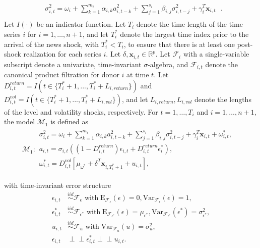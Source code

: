 \documentclass{uiucthesis2021}
\newcommand{\x}{\textbf{x}}
\newcommand{\simiid}{\stackrel{iid}{\sim}} %
\newcommand{\indep}{\perp \!\!\! \perp } %
\def\mrm#1{\mathrm{#1}} %
\def\mc#1{\mathcal{#1}} %
\def\mc#1{\mathcal{#1}}
\theoremstyle{definition}
\begin{document}
\begin{align*}
&\sigma_{i,t}^{2} = \omega_{i} + \sum^{m_{i}}_{k=1}\alpha_{i,k}a^{2}_{i,t-k} + \sum_{j=1}^{s_{i}}\beta_{i,j}\sigma_{i,t-j}^{2} + \gamma_{i}^{T} \x_{i,t} \text{ }. \\
\end{align*}
Let $I(\cdot)$ be an indicator function.  Let $T_i$ denote the time length of the time series $i$ for $i = 1, \ldots, n+1$, and let $T_i^*$ denote the largest time index prior to the arrival of the news shock, with $T_i^* < T_i$, to ensure that there is at least one post-shock realization for each series $i$.  Let $\delta, \x_{i,t} \in \mathbb{R}^{p}$.  Let $\mathcal{F}_{i}$ with a single-variable subscript denote a univariate, time-invariant $\sigma$-algebra, and $\mathcal{F}_{i,t}$ denote the canonical product filtration for donor $i$ at time $t$.  Let $D^{return}_{i,t} = I(t \in \{T_i^* + 1,...,T_i^* + L_{i, return}\})$ and $D^{vol}_{i,t} = I(t \in \{T_i^* + 1,...,T_i^* + L_{i, vol}\})$, and let $L_{i,return},L_{i,vol}$ denote the lengths of the level and volatility shocks, respectively.  For $t= 1, \ldots, T_i$ and $i = 1, \ldots, n+1$, the model $\mc{M}_1$ is defined as 
\begin{align*}
  \mc{M}_1 \colon \begin{array}{l}
     \sigma^{2}_{i,t} = \omega_{i} + \sum^{m_{i}}_{k=1}\alpha_{i,k}a^{2}_{i,t-k} + \sum_{j=1}^{s_{i}}\beta_{i,j}\sigma_{i,t-j}^{2} + \gamma_{i}^{T} \x_{i,t} + \omega^{*}_{i,t}, \text{ }\\[.2cm]
     a_{i,t} = \sigma_{i,t}((1-D^{return}_{i,t})\epsilon_{i,t} + D^{return}_{i,t}\epsilon^{*}_{i}),\\[.2cm]
    \omega_{i,t}^{*} = D^{vol}_{i,t}[\mu_{\omega^{*}}+\delta^{T}\x_{i,T^{*}_{i}+1}+ u_{i,t}],
  \end{array}
  \end{align*}

with time-invariant error structure
  \begin{align*}
    \epsilon_{i,t} &\simiid \mc{F}_{\epsilon} \text{ with}  \; \mrm{E}_{\mc{F}_{\epsilon}}(\epsilon) = 0, \mrm{Var}_{\mc{F}_{\epsilon}}(\epsilon)  = 1,  \\
    \epsilon^{*}_{i,t} &\simiid \mc{F}_{\epsilon^{*}} \text{ with}  \; \mrm{E}_{\mc{F}_{\epsilon^{*}}}(\epsilon) = \mu_{\epsilon^{*}}, \mrm{Var}_{\mc{F}_{\epsilon^{*}}}(\epsilon^{*})  = \sigma^2_{\epsilon^{*}},  \\
    u_{i,t} & \simiid  \mc{F}_{u} \text{ with}  \; \mrm{Var}_{\mc{F}_{u}}(u) = \sigma^2_{u},\\
    \epsilon_{i,t} & \indep  \epsilon^{*}_{i,t}  \indep u_{i,t}.
    \end{align*}
\end{document}
